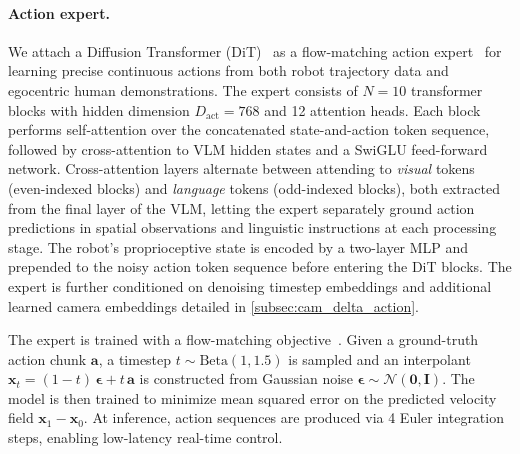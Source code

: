 \paragraph{Action expert.}
We attach a Diffusion Transformer (DiT)~\citep{peebles2023scalable} as a flow-matching action expert~\citep{chi2023diffusion,black2024pi0,adaptdiffuser} for learning precise continuous actions from both robot trajectory data and egocentric human demonstrations.
The expert consists of $N{=}10$ transformer blocks with hidden dimension $D_{\mathrm{act}}{=}768$ and 12 attention heads.
Each block performs self-attention over the concatenated state-and-action token sequence, followed by cross-attention to VLM hidden states and a SwiGLU feed-forward network.
Cross-attention layers alternate between attending to \emph{visual} tokens (even-indexed blocks) and \emph{language} tokens (odd-indexed blocks), both extracted from the final layer of the VLM, letting the expert separately ground action predictions in spatial observations and linguistic instructions at each processing stage.
The robot's proprioceptive state is encoded by a two-layer MLP and prepended to the noisy action token sequence before entering the DiT blocks. The expert is further conditioned on denoising timestep embeddings and additional learned camera embeddings detailed in \cref{subsec:cam_delta_action}.


The expert is trained with a flow-matching objective~\citep{lipman2023flow,esser2024scaling}. Given a ground-truth action chunk $\mathbf{a}$, a timestep $t \sim \mathrm{Beta}(1, 1.5)$ is sampled and an interpolant $\mathbf{x}_t = (1{-}t)\,\boldsymbol{\epsilon} + t\,\mathbf{a}$ is constructed from Gaussian noise $\boldsymbol{\epsilon}\sim\mathcal{N}(\mathbf{0},\mathbf{I})$. The model is then trained to minimize mean squared error on the predicted velocity field $\mathbf{x}_1 - \mathbf{x}_0$. At inference, action sequences are produced via 4 Euler integration steps, enabling low-latency real-time control. 

